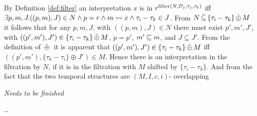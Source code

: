 By Definition \ref{def:filter} an interpretation $x$ is in $r^{\operatorname{filter}(N, \mathcal{D}_j, \tau_j, \tau_k)}$ iff $\exists p,m,J . ((p,m), J) \in N \land p = r \land m \rightsquigarrow x \land \tau_i - \tau_k \in J$.
From $N \,\ddot{\subseteq}\, \{ \tau_i - \tau_k \} \,\dot{\oplus}\, M$ it follows that for any $p,m,J$, with $((p,m), J) \in N$ there must exist $p',m',J'$,
    with $((p',m'), J') \in \{\tau_i - \tau_k \} \,\dot{\oplus}\, M$,
    $p=p'$,
    $m' \sqsubseteq m$,
    and $J \subseteq J'$.
From the definition of $\,\dot{\oplus}\,$ it is apparent that
$((p',m'), J') \in \{\tau_i - \tau_k \} \,\dot{\oplus}\, M$
iff
$((p',m'), \{\tau_k - \tau_i\} \oplus J') \in M$.
Hence there is an interpretation in the filtration by $N$, if it is in the filtration with $M$ shifted by $\{\tau_i - \tau_k\}$.
And from the fact that the two temporal structures are $(M,I,c,i)$- overlapping

\textit{Needs to be finished}

\dots


